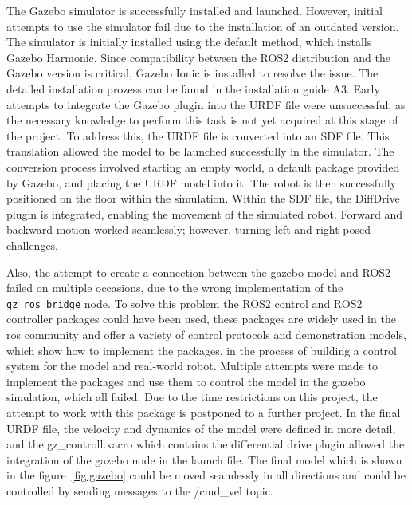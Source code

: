 The Gazebo simulator is successfully installed and launched. However, initial attempts to use the simulator fail due to the installation of an outdated version. The simulator is initially installed using the default method, which installs Gazebo Harmonic. Since compatibility between the ROS2 distribution and the Gazebo version is critical, Gazebo Ionic is installed to resolve the issue. The detailed installation prozess can be faund in the installation guide A3. 
Early attempts to integrate the Gazebo plugin into the URDF file were unsuccessful, as the necessary knowledge to perform this task is not yet acquired at this stage of the project. 
To address this, the URDF file is converted into an SDF file. This translation allowed the model to be launched successfully in the simulator. The conversion process involved starting an empty world, a default package provided by Gazebo, and placing the URDF model into it. The robot is then successfully positioned on the floor within the simulation. Within the SDF file, the DiffDrive plugin is integrated, enabling the movement of the simulated robot. Forward and backward motion worked seamlessly; however, turning left and right posed challenges. 

Also, the attempt to create a connection between the gazebo model and 
ROS2 failed on multiple occasions, due to the wrong implementation of the \verb|gz_ros_bridge| node.
To solve this problem the ROS2 control and ROS2 controller packages could have been used, these packages are widely used in the ros community and offer a variety of control protocols and demonstration models, which show how to implement the packages, in the process of building a control system for the model and real-world robot. Multiple attempts were made to implement the packages and use them to control the model in the gazebo simulation, which all failed. Due to the time restrictions on this project, the attempt to work with this package is postponed to a further project.  In the final URDF file, the velocity and dynamics of the model were defined in more detail, and the gz\_controll.xacro which contains the differential drive plugin allowed the integration of the gazebo node in the launch file. The final model which is shown in the figure~\ref{fig:gazebo} could be moved seamlessly in all directions and could be controlled by sending messages to the /cmd\_vel topic.   

